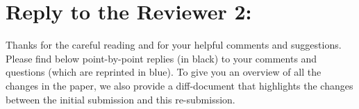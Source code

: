 \documentclass[11pt]{article}
\newcommand{\referee}[1]{\vspace{.1ex}\noindent{\textcolor{blue}{#1}}}
\newcommand{\+}{\otimes}
\begin{document}
\section*{Reply to the Reviewer 2:}

Thanks for the careful reading and for your helpful comments and
suggestions.  Please find below point-by-point replies (in black) to
your comments and questions (which are reprinted in blue). To give you
an overview of all the changes in the paper, we also provide a
diff-document that highlights the changes between the initial
submission and this re-submission.\\[1ex]

\referee{I have read the paper with pleasure and have the following
  suggestions for improvement:\\}
\end{document}
